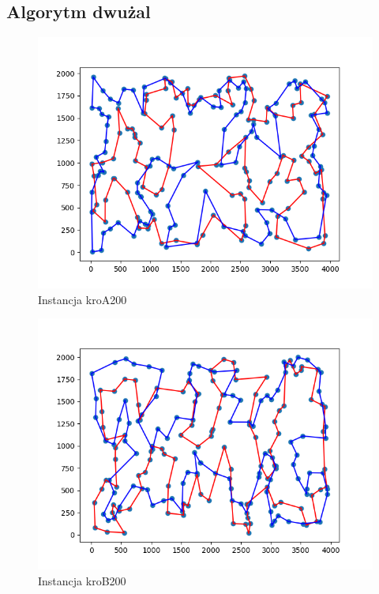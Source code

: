 \documentclass[11pt]{article}
\begin{document}
\subsection{Algorytm dwużal}\label{subsec:algorytm-dwużal}

\begin{figure}[H]
    \centering
    \includegraphics{best_paths/two_regret_kroA200.tsp.png}
    \caption{Instancja kroA200}
    \label{fig:Two-regret-kroA}
\end{figure}
\begin{figure}[H]
    \centering
    \includegraphics{best_paths/two_regret_kroB200.tsp.png}
    \caption{Instancja kroB200}
    \label{fig:Two-regret-kroB}
\end{figure}
\end{document}
